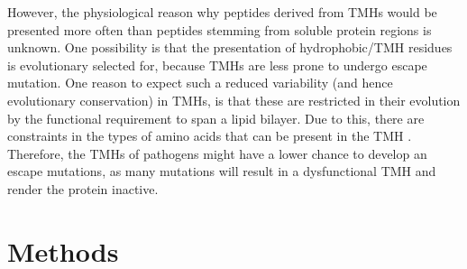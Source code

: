 
%

However, the physiological reason why peptides derived from TMHs 
would be presented more often than peptides 
stemming from soluble protein regions is unknown. 
One possibility is that the presentation of 
hydrophobic/TMH residues is evolutionary selected for, 
because TMHs are less prone to undergo escape mutation. 
One reason to expect such a reduced 
variability (and hence evolutionary conservation) in TMHs, 
is that these are restricted in their evolution 
by the functional requirement to span a lipid bilayer. 
Due to this, there are constraints in the types of amino acids 
that can be present in the TMH . 
Therefore, the TMHs of pathogens 
might have a lower chance to develop an escape mutations, 
as many mutations will result in a dysfunctional TMH 
and render the protein inactive.



\section{Methods}

